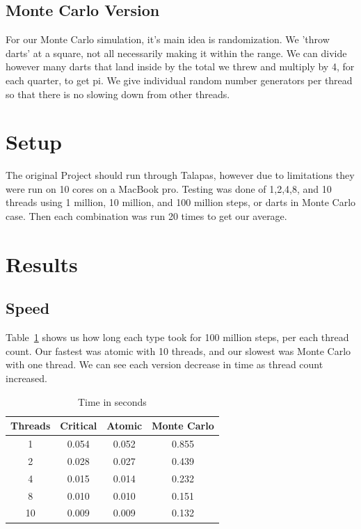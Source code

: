 \documentclass[11pt,twocolumn]{article}
\begin{document}
\subsection{Monte Carlo Version}
For our Monte Carlo simulation, it's main idea is randomization. We 'throw darts' at a square, not all necessarily making it within the range. We can divide however many darts that land inside by the total we threw and multiply by 4, for each quarter, to get pi. We give individual random number generators per thread so that there is no slowing down from other threads. 

\section{Setup}
The original Project should run through Talapas, however due to limitations they were run on 10 cores on a MacBook pro. Testing was done of 1,2,4,8, and 10 threads using 1 million, 10 million, and 100 million steps, or darts in Monte Carlo case. Then each combination was run 20 times to get our average.

\section{Results}

\subsection{Speed}
Table~\ref{tab:time} shows us how long each type took for 100 million steps, per each thread count. Our fastest was atomic with 10 threads, and our slowest was Monte Carlo with one thread. We can see each version decrease in time as thread count increased. 

\begin{table}[h]
\centering
\begin{tabular}{|c|c|c|c|}
\hline
Threads & Critical & Atomic & Monte Carlo \\
\hline
1  & 0.054 & 0.052 & 0.855 \\
2  & 0.028 & 0.027 & 0.439 \\
4  & 0.015 & 0.014 & 0.232 \\
8  & 0.010 & 0.010 & 0.151 \\
10 & 0.009 & 0.009 & 0.132 \\
\hline
\end{tabular}
\caption{Time in seconds}
\label{tab:time}
\end{table}
\end{document}
